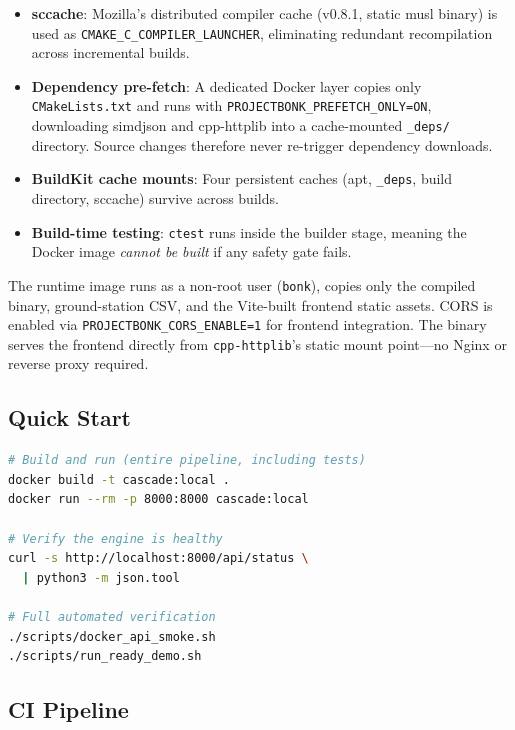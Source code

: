 \documentclass[10pt,twocolumn,letterpaper]{article}
\begin{document}
\begin{itemize}[nosep,leftmargin=*]
  \item \textbf{sccache}: Mozilla's distributed compiler cache (v0.8.1,
    static musl binary) is used as \texttt{CMAKE\_C\_COMPILER\_LAUNCHER},
    eliminating redundant recompilation across incremental builds.
  \item \textbf{Dependency pre-fetch}: A dedicated Docker layer copies
    only \texttt{CMakeLists.txt} and runs with
    \texttt{PROJECTBONK\_PREFETCH\_ONLY=ON}, downloading simdjson and
    cpp-httplib into a cache-mounted \texttt{\_deps/} directory.  Source
    changes therefore never re-trigger dependency downloads.
  \item \textbf{BuildKit cache mounts}: Four persistent caches (apt,
    \texttt{\_deps}, build directory, sccache) survive across builds.
  \item \textbf{Build-time testing}: \texttt{ctest} runs inside the
    builder stage, meaning the Docker image \emph{cannot be built} if any
    safety gate fails.
\end{itemize}

\noindent
The runtime image runs as a non-root user (\texttt{bonk}), copies only the
compiled binary, ground-station CSV, and the Vite-built frontend static
assets.  CORS is enabled via \texttt{PROJECTBONK\_CORS\_ENABLE=1} for
frontend integration.  The binary serves the frontend directly from
\texttt{cpp-httplib}'s static mount point---no Nginx or reverse proxy
required.

\subsection{Quick Start}

\begin{lstlisting}[language=bash]
# Build and run (entire pipeline, including tests)
docker build -t cascade:local .
docker run --rm -p 8000:8000 cascade:local

# Verify the engine is healthy
curl -s http://localhost:8000/api/status \
  | python3 -m json.tool

# Full automated verification
./scripts/docker_api_smoke.sh
./scripts/run_ready_demo.sh
\end{lstlisting}

\subsection{CI Pipeline}
\end{document}
